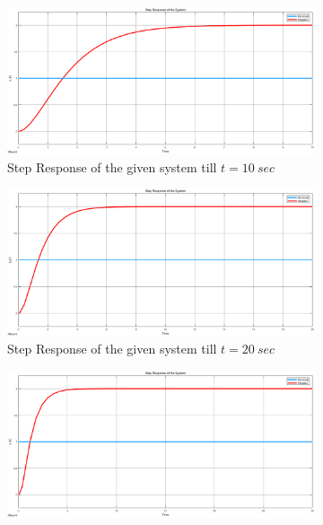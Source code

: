 \documentclass[a4paper,12pt]{article}
\begin{document}
\begin{enumerate}
\begin{enumerate}
		\begin{figure}[H]
			\setlength{\unitlength}{\textwidth} 
			\centering
			\begin{subfigure}{.5\textwidth}
				\centering
				\includegraphics[width=0.48\unitlength]{images/stepb}
				\caption{\label{fig:sb1} Step Response of the given system till $t=10\ sec$ }
			\end{subfigure}%
			\begin{subfigure}{.5\textwidth}
				\centering
				\includegraphics[width=0.48\unitlength]{images/stepb2}
				\caption{\label{fig:sb2} Step Response of the given system till $t=20\ sec$ }
			\end{subfigure}
			\begin{subfigure}{.5\textwidth}
				\centering
				\includegraphics[width=0.48\unitlength]{images/stepb3}

\end{subfigure}
\end{figure}
\end{enumerate}
\end{enumerate}
\end{document}
